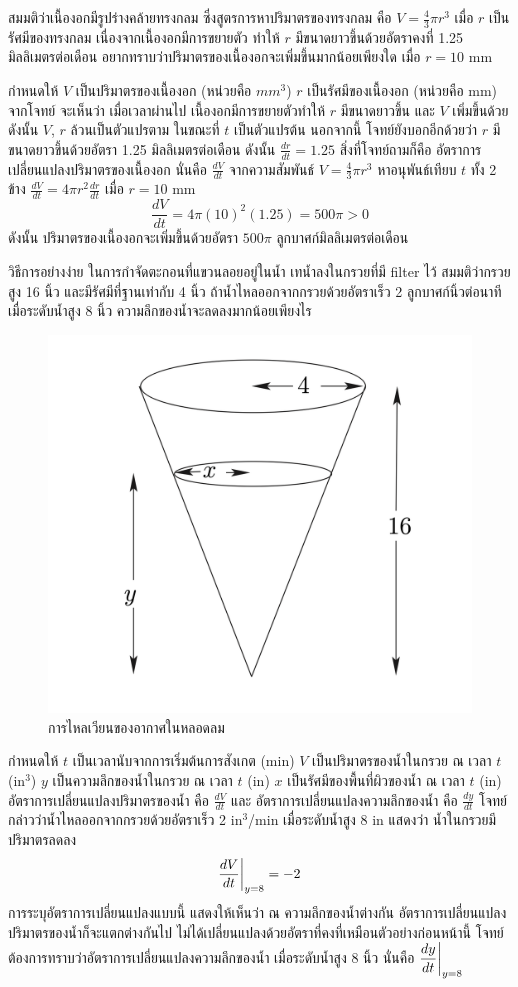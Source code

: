 \documentclass[
]{book}
\begin{document}
สมมติว่าเนื้องอกมีรูปร่างคล้ายทรงกลม ซึ่งสูตรการหาปริมาตรของทรงกลม คือ
\(\displaystyle V=\frac{4}{3}\pi r^3\) เมื่อ \(r\) เป็นรัศมีของทรงกลม
เนื่องจากเนื้องอกมีการขยายตัว ทำให้ \(r\) มีขนาดยาวขึ้นด้วยอัตราคงที่ 1.25
มิลลิเมตรต่อเดือน อยากทราบว่าปริมาตรของเนื้องอกจะเพิ่มขึ้นมากน้อยเพียงใด เมื่อ \(r=10\)
mm

กำหนดให้ \(V\) เป็นปริมาตรของเนื้องอก (หน่วยคือ \(mm^3\)) \(r\) เป็นรัศมีของเนื้องอก
(หน่วยคือ mm) จากโจทย์ จะเห็นว่า เมื่อเวลาผ่านไป เนื้องอกมีการขยายตัวทำให้ \(r\)
มีขนาดยาวขึ้น และ \(V\) เพิ่มขึ้นด้วย ดังนั้น \(V\), \(r\) ล้วนเป็นตัวแปรตาม ในขณะที่
\(t\) เป็นตัวแปรต้น นอกจากนี้ โจทย์ยังบอกอีกด้วยว่า \(r\) มีขนาดยาวขึ้นด้วยอัตรา 1.25
มิลลิเมตรต่อเดือน ดังนั้น \(\displaystyle\frac{dr}{dt}=1.25\) สิ่งที่โจทย์ถามก็คือ
อัตราการเปลี่ยนแปลงปริมาตรของเนื้องอก นั่นคือ \(\displaystyle\frac{dV}{dt}\)
จากความสัมพันธ์ \(\displaystyle V=\frac{4}{3}\pi r^3\) หาอนุพันธ์เทียบ \(t\) ทั้ง
2 ข้าง \(\displaystyle\frac{dV}{dt}=4\pi r^2 \frac{dr}{dt}\) เมื่อ \(r=10\)
mm \[\frac{dV}{dt}=4\pi(10)^2 (1.25)=500\pi>0\] ดังนั้น
ปริมาตรของเนื้องอกจะเพิ่มขึ้นด้วยอัตรา \(500\pi\) ลูกบาศก์มิลลิเมตรต่อเดือน

วิธีการอย่างง่าย ในการกำจัดตะกอนที่แขวนลอยอยู่ในน้ำ เทน้ำลงในกรวยที่มี filter ไว้
สมมติว่ากรวยสูง 16 นิ้ว และมีรัศมีที่ฐานเท่ากับ 4 นิ้ว ถ้าน้ำไหลออกจากกรวยด้วยอัตราเร็ว 2
ลูกบาศก์นิ้วต่อนาที เมื่อระดับน้ำสูง 8 นิ้ว ความลึกของน้ำจะลดลงมากน้อยเพียงไร

\begin{figure}

{\centering \includegraphics[width=0.5\linewidth]{images/fig-derivative-4} 

}

\caption{การไหลเวียนของอากาศในหลอดลม}\label{fig:fig-derivative-4}
\end{figure}

กำหนดให้ \(t\) เป็นเวลานับจากการเริ่มต้นการสังเกต (min) \(V\)
เป็นปริมาตรของน้ำในกรวย ณ เวลา \(t\) (in\(^3\)) \(y\) เป็นความลึกของน้ำในกรวย
ณ เวลา \(t\) (in) \(x\) เป็นรัศมีของพื้นที่ผิวของน้ำ ณ เวลา \(t\) (in)
อัตราการเปลี่ยนแปลงปริมาตรของน้ำ คือ \(\displaystyle \frac{dV}{dt}\) และ
อัตราการเปลี่ยนแปลงความลึกของน้ำ คือ \(\displaystyle  \frac{dy}{dt}\)
โจทย์กล่าวว่าน้ำไหลออกจากกรวยด้วยอัตราเร็ว 2 in\(^3\)/min เมื่อระดับน้ำสูง 8 in
แสดงว่า น้ำในกรวยมีปริมาตรลดลง \[\frac{dV}{dt}\bigg{|}_{y=8} = -2\]
การระบุอัตราการเปลี่ยนแปลงแบบนี้ แสดงให้เห็นว่า ณ ความลึกของน้ำต่างกัน
อัตราการเปลี่ยนแปลงปริมาตรของน้ำก็จะแตกต่างกันไป
ไม่ได้เปลี่ยนแปลงด้วยอัตราที่คงที่เหมือนตัวอย่างก่อนหน้านี้
โจทย์ต้องการทราบว่าอัตราการเปลี่ยนแปลงความลึกของน้ำ เมื่อระดับน้ำสูง 8 นิ้ว นั่นคือ
\(\displaystyle  \frac{dy}{dt}\bigg{|}_{y=8}\)
\end{document}

